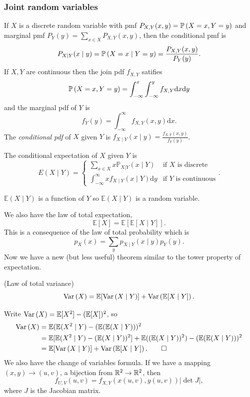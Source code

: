 \documentclass{article}
\begin{document}
\subsubsection{Joint random variables}
If $ X $ is a discrete random variable with pmf $ P_{X,Y}(x,y)=\mathbb{P}\left({X=x, Y=y}\right) $ and marginal pmf $ P_Y(y)=\sum_{x\in X}P_{X,Y}(x,y) $, then the conditional pmf is
\[
	P_{X\mid Y}(x\mid y)=\mathbb{P}\left({X=x\mid Y=y}\right)=\frac{P_{X,Y}(x,y)}{P_Y(y)}.
\]
If $ X,Y $ are continuous then the join pdf $ f_{X,Y} $ satifies
\[
	\mathbb{P}\left({X=x,Y=y}\right) = \int_{-\infty}^x\int_{-\infty}^y f_{X,Y}\mathrm dx\mathrm dy
\]
and the marginal pdf of $ Y $ is
\[
	f_Y(y)=\int_{-\infty}^\infty f_{X,Y}(x,y)\mathrm dx.
\]
The \textit{conditional pdf} of $ X $ given $ Y $ is $ f_{X\mid Y}(x\mid y)=\frac{f_{X,Y}(x,y)}{f_Y(y)} $.\par
The conditional expectation of $ X $ given $ Y $ is
\[
E(X\mid Y) = \begin{cases}
	\sum_{x\in X} x\mathbb P_{X|Y}(x\mid Y) & \text{if } X \text{ is discrete} \\
	\int_{-\infty}^\infty xf_{X\mid Y}(x\mid Y)\mathrm dy & \text{if } Y \text{ is continuous}
\end{cases}.
\]
\begin{remark}
$ \mathbb E(X\mid Y) $ is a function of $ Y $ so $ \mathbb E(X\mid Y) $ is a random variable.
\end{remark}
We also have the law of total expectation,
\[
	\mathbb E[X]=\mathbb E[\mathbb E[X\mid Y]].
\]
This is a consequence of the law of total probability which is
\[
	p_X(x)=\sum_y p_{X\mid Y}(x\mid y)p_Y(y).
\]
Now we have a new (but less useful) theorem similar to the tower property of expectation.
\begin{theorem}
	(Law of total variance)
	\[
		\operatorname{Var}\left({X}\right)=\mathbb E[\operatorname{Var}\left({X\mid Y}\right)] +\operatorname{Var}\left({\mathbb E[X\mid Y]}\right).
	\]
\end{theorem}
\pf Write $ \operatorname{Var}\left({X}\right) = \mathbb E[X^2]-(\mathbb E[X])^2 $, so
\begin{align*}
	\operatorname{Var}\left({X}\right) &= \mathbb E(\mathbb E(X^2\mid Y) - (\mathbb E(\mathbb E(X\mid Y)))^2 \\
		&= \mathbb E[\mathbb E(X^2\mid Y)-(\mathbb E(X\mid Y))^2] + \mathbb E((\mathbb E(X\mid Y))^2) - (\mathbb E(\mathbb E(X\mid Y)))^2\\
		&= \mathbb E[\operatorname{Var}\left({X\mid Y}\right)] +\operatorname{Var}\left({\mathbb E[X\mid Y]}\right).\qed
\end{align*}
We also have the change of variables formula. If we have a mapping $ (x,y)\to (u,v) $, a bijection from $ \mathbb{R}^2\to \mathbb{R}^2 $, then
\[
	f_{U,V}(u,v) = f_{X,Y}(x(u,v),y(u,v))|\det J|,
\]
where $ J $ is the Jacobian matrix.
\end{document}
